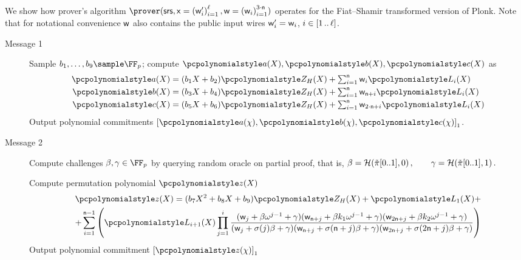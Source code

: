  We show how prover's algorithm
$\prover(\srs, \inp=\brak{\wit'_i}_{i = 1}^\instsize, \wit = \brak{\wit_i}_{i=1}^{3 \cdot \noofc})$ operates for
the Fiat--Shamir transformed version of Plonk. Note that for notational convenience $\mathsf{w}$ also contains the public input wires $\mathsf{w}'_i=\mathsf{w}_i$, $i\in [1 \, .. \, \ell]$.
\begin{description}
	\item[Message 1] Sample $b_1, \ldots, b_9 \sample \FF_p$; compute
	$\p{a}(X), \p{b}(X), \p{c}(X)$ as
	\begin{align*}
	\p{a}(X) &= (b_1 X + b_2)\p{Z_H}(X) + \textstyle \sum_{i = 1}^{\noofc} \wit_i \lag_i(X) \\
	\p{b}(X) &= (b_3 X + b_4)\p{Z_H}(X) + \textstyle \sum_{i = 1}^{\noofc} \wit_{\noofc + i} \lag_i(X) \\
	\p{c}(X) &= (b_5 X + b_6)\p{Z_H}(X) + \textstyle \sum_{i = 1}^{\noofc} \wit_{2 \cdot \noofc + i} \lag_i(X) 
	\end{align*}
	Output polynomial commitments $\gone{\p{a}(\chi), \p{b}(\chi), \p{c}(\chi)}$.  
	
	\item[Message 2] Compute challenges $\beta, \gamma \in \FF_p$ by querying random oracle
	on partial proof, that is,
	\(
	\beta = \mathcal{H}(\tilde{\pi}[0..1], 0)\,, \qquad \gamma = \mathcal{H}(\tilde{\pi}[0..1], 1)\,.
	\)
	
	Compute permutation polynomial $\p{z}(X)$
	\begin{multline*}
	\p{z}(X) = (b_7 X^2 + b_8 X + b_9)\p{Z_H}(X) + \lag_1(X) + \\
	+ \sum_{i = 1}^{\noofc - 1} \left(\lag_{i + 1} (X) \prod_{j = 1}^{i} \frac{
		(\wit_j +\beta \omega^{j - 1} + \gamma)(\wit_{\noofc + j} + \beta k_1
		\omega^{j - 1} + \gamma)(\wit_{2 \noofc + j} +\beta k_2 \omega^{j- 1} +
		\gamma)} {(\wit_j+\sigma(j) \beta + \gamma)(\wit_{\noofc + j} + \sigma(\noofc
		+ j)\beta + \gamma)(\wit_{2 \noofc + j} + \sigma(2 \noofc + j)\beta +
		\gamma)}\right)
	\end{multline*}
	Output polynomial commitment $\gone{\p{z}(\chi)}$
	

\end{description}

